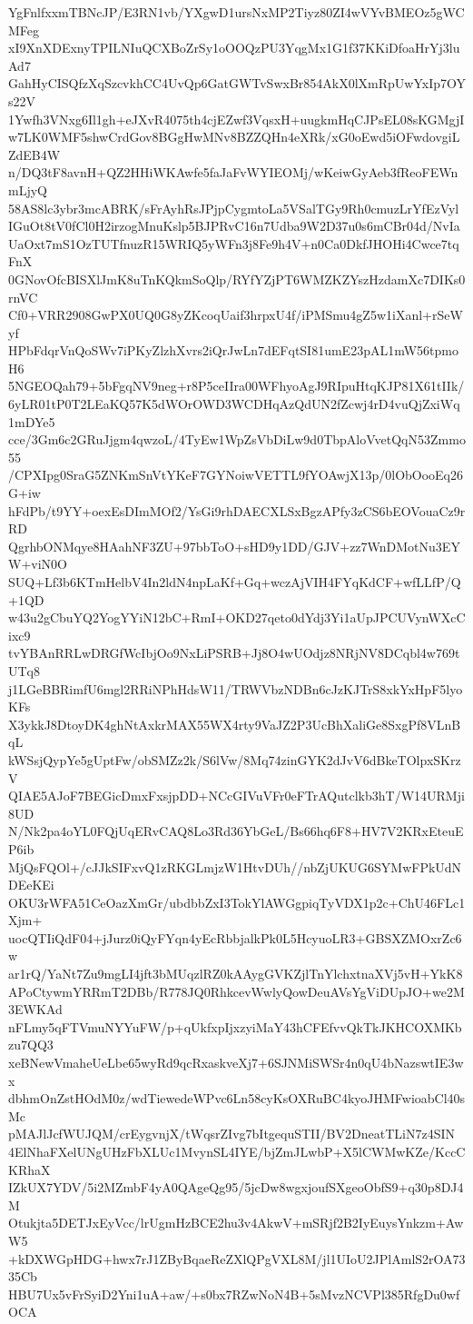 YgFnlfxxmTBNcJP/E3RN1vb/YXgwD1ursNxMP2Tiyz80ZI4wVYvBMEOz5gWCMFeg
xI9XnXDExnyTPILNIuQCXBoZrSy1oOOQzPU3YqgMx1G1f37KKiDfoaHrYj3luAd7
GahHyCISQfzXqSzcvkhCC4UvQp6GatGWTvSwxBr854AkX0lXmRpUwYxIp7OYs22V
1Ywfh3VNxg6Il1gh+eJXvR4075th4cjEZwf3VqsxH+uugkmHqCJPsEL08sKGMgjI
w7LK0WMF5shwCrdGov8BGgHwMNv8BZZQHn4eXRk/xG0oEwd5iOFwdovgiLZdEB4W
n/DQ3tF8avnH+QZ2HHiWKAwfe5faJaFvWYIEOMj/wKeiwGyAeb3fReoFEWnmLjyQ
58AS8lc3ybr3mcABRK/sFrAyhRsJPjpCygmtoLa5VSalTGy9Rh0cmuzLrYfEzVyl
IGuOt8tV0fCl0H2irzogMnuKslp5BJPRvC16n7Udba9W2D37u0s6mCBr04d/NvIa
UaOxt7mS1OzTUTfnuzR15WRIQ5yWFn3j8Fe9h4V+n0Ca0DkfJHOHi4Cwce7tqFnX
0GNovOfcBISXlJmK8uTnKQkmSoQlp/RYfYZjPT6WMZKZYszHzdamXc7DIKs0rnVC
Cf0+VRR2908GwPX0UQ0G8yZKcoqUaif3hrpxU4f/iPMSmu4gZ5w1iXanl+rSeWyf
HPbFdqrVnQoSWv7iPKyZlzhXvrs2iQrJwLn7dEFqtSI81umE23pAL1mW56tpmoH6
5NGEOQah79+5bFgqNV9neg+r8P5ceIIra00WFhyoAgJ9RIpuHtqKJP81X61tIIk/
6yLR01tP0T2LEaKQ57K5dWOrOWD3WCDHqAzQdUN2fZcwj4rD4vuQjZxiWq1mDYe5
cce/3Gm6c2GRuJjgm4qwzoL/4TyEw1WpZsVbDiLw9d0TbpAloVvetQqN53Zmmo55
/CPXIpg0SraG5ZNKmSnVtYKeF7GYNoiwVETTL9fYOAwjX13p/0lObOooEq26G+iw
hFdPb/t9YY+oexEsDImMOf2/YsGi9rhDAECXLSxBgzAPfy3zCS6bEOVouaCz9rRD
QgrhbONMqye8HAahNF3ZU+97bbToO+sHD9y1DD/GJV+zz7WnDMotNu3EYW+viN0O
SUQ+Lf3b6KTmHelbV4In2ldN4npLaKf+Gq+wczAjVIH4FYqKdCF+wfLLfP/Q+1QD
w43u2gCbuYQ2YogYYiN12bC+RmI+OKD27qeto0dYdj3Yi1aUpJPCUVynWXcCixc9
tvYBAnRRLwDRGfWcIbjOo9NxLiPSRB+Jj8O4wUOdjz8NRjNV8DCqbl4w769tUTq8
j1LGeBBRimfU6mgl2RRiNPhHdsW11/TRWVbzNDBn6cJzKJTrS8xkYxHpF5lyoKFs
X3ykkJ8DtoyDK4ghNtAxkrMAX55WX4rty9VaJZ2P3UcBhXaliGe8SxgPf8VLnBqL
kWSsjQypYe5gUptFw/obSMZz2k/S6lVw/8Mq74zinGYK2dJvV6dBkeTOlpxSKrzV
QIAE5AJoF7BEGicDmxFxsjpDD+NCcGIVuVFr0eFTrAQutclkb3hT/W14URMji8UD
N/Nk2pa4oYL0FQjUqERvCAQ8Lo3Rd36YbGeL/Bs66hq6F8+HV7V2KRxEteuEP6ib
MjQsFQOl+/cJJkSIFxvQ1zRKGLmjzW1HtvDUh//nbZjUKUG6SYMwFPkUdNDEeKEi
OKU3rWFA51CeOazXmGr/ubdbbZxI3TokYlAWGgpiqTyVDX1p2c+ChU46FLc1Xjm+
uocQTIiQdF04+jJurz0iQyFYqn4yEcRbbjalkPk0L5HcyuoLR3+GBSXZMOxrZc6w
ar1rQ/YaNt7Zu9mgLI4jft3bMUqzlRZ0kAAygGVKZjlTnYlchxtnaXVj5vH+YkK8
APoCtywmYRRmT2DBb/R778JQ0RhkcevWwlyQowDeuAVsYgViDUpJO+we2M3EWKAd
nFLmy5qFTVmuNYYuFW/p+qUkfxpIjxzyiMaY43hCFEfvvQkTkJKHCOXMKbzu7QQ3
xeBNewVmaheUeLbe65wyRd9qcRxaskveXj7+6SJNMiSWSr4n0qU4bNazswtIE3wx
dbhmOnZstHOdM0z/wdTiewedeWPvc6Ln58cyKsOXRuBC4kyoJHMFwioabCl40sMc
pMAJlJcfWUJQM/crEygvnjX/tWqsrZIvg7bItgequSTII/BV2DneatTLiN7z4SIN
4ElNhaFXelUNgUHzFbXLUc1MvynSL4IYE/bjZmJLwbP+X5lCWMwKZe/KccCKRhaX
IZkUX7YDV/5i2MZmbF4yA0QAgeQg95/5jcDw8wgxjoufSXgeoObfS9+q30p8DJ4M
Otukjta5DETJxEyVcc/lrUgmHzBCE2hu3v4AkwV+mSRjf2B2IyEuysYnkzm+AwW5
+kDXWGpHDG+hwx7rJ1ZByBqaeReZXlQPgVXL8M/jl1UIoU2JPlAmlS2rOA7335Cb
HBU7Ux5vFrSyiD2Yni1uA+aw/+s0bx7RZwNoN4B+5sMvzNCVPl385RfgDu0wfOCA
